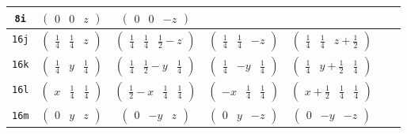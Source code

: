 \documentclass[fleqn,9pt,landscape]{jsarticle}
\begin{document}
\begin{center}
\begin{longtable}{ccccccc}
{\tt 8i} & $ \begin{pmatrix} 0 & 0 & z \end{pmatrix} $ & $ \begin{pmatrix} 0 & 0 & - z \end{pmatrix} $ & $  $ & $  $ & $  $ & $  $ \\ \hline
{\tt 16j} & $ \begin{pmatrix} \frac{1}{4} & \frac{1}{4} & z \end{pmatrix} $ & $ \begin{pmatrix} \frac{1}{4} & \frac{1}{4} & \frac{1}{2} - z \end{pmatrix} $ & $ \begin{pmatrix} \frac{1}{4} & \frac{1}{4} & - z \end{pmatrix} $ & $ \begin{pmatrix} \frac{1}{4} & \frac{1}{4} & z + \frac{1}{2} \end{pmatrix} $ & $  $ & $  $ \\ \hline
{\tt 16k} & $ \begin{pmatrix} \frac{1}{4} & y & \frac{1}{4} \end{pmatrix} $ & $ \begin{pmatrix} \frac{1}{4} & \frac{1}{2} - y & \frac{1}{4} \end{pmatrix} $ & $ \begin{pmatrix} \frac{1}{4} & - y & \frac{1}{4} \end{pmatrix} $ & $ \begin{pmatrix} \frac{1}{4} & y + \frac{1}{2} & \frac{1}{4} \end{pmatrix} $ & $  $ & $  $ \\ \hline
{\tt 16l} & $ \begin{pmatrix} x & \frac{1}{4} & \frac{1}{4} \end{pmatrix} $ & $ \begin{pmatrix} \frac{1}{2} - x & \frac{1}{4} & \frac{1}{4} \end{pmatrix} $ & $ \begin{pmatrix} - x & \frac{1}{4} & \frac{1}{4} \end{pmatrix} $ & $ \begin{pmatrix} x + \frac{1}{2} & \frac{1}{4} & \frac{1}{4} \end{pmatrix} $ & $  $ & $  $ \\ \hline
{\tt 16m} & $ \begin{pmatrix} 0 & y & z \end{pmatrix} $ & $ \begin{pmatrix} 0 & - y & z \end{pmatrix} $ & $ \begin{pmatrix} 0 & y & - z \end{pmatrix} $ & $ \begin{pmatrix} 0 & - y & - z \end{pmatrix} $ & $  $ & $  $ \\ \hline

\end{longtable}
\end{center}
\end{document}
